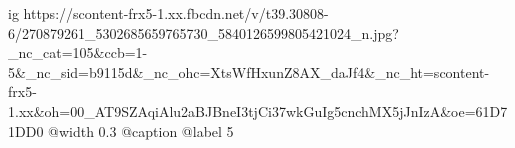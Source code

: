  
 
 
 
 

\ifcmt
  ig https://scontent-frx5-1.xx.fbcdn.net/v/t39.30808-6/270879261_5302685659765730_5840126599805421024_n.jpg?_nc_cat=105&ccb=1-5&_nc_sid=b9115d&_nc_ohc=XtsWfHxunZ8AX_daJf4&_nc_ht=scontent-frx5-1.xx&oh=00_AT9SZAqiAlu2aBJBneI3tjCi37wkGuIg5cnchMX5jJnIzA&oe=61D71DD0
  @width 0.3
	@caption @label 5
\fi
